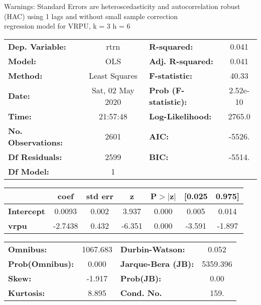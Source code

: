 Warnings: \newline
 [1] Standard Errors are heteroscedasticity and autocorrelation robust (HAC) using 1 lags and without small sample correction\\ 

regression model for VRPU, k = 3 h = 6\begin{center}
\begin{tabular}{lclc}
\toprule
\textbf{Dep. Variable:}    &       rtrn       & \textbf{  R-squared:         } &     0.041   \\
\textbf{Model:}            &       OLS        & \textbf{  Adj. R-squared:    } &     0.041   \\
\textbf{Method:}           &  Least Squares   & \textbf{  F-statistic:       } &     40.33   \\
\textbf{Date:}             & Sat, 02 May 2020 & \textbf{  Prob (F-statistic):} &  2.52e-10   \\
\textbf{Time:}             &     21:57:48     & \textbf{  Log-Likelihood:    } &    2765.0   \\
\textbf{No. Observations:} &        2601      & \textbf{  AIC:               } &    -5526.   \\
\textbf{Df Residuals:}     &        2599      & \textbf{  BIC:               } &    -5514.   \\
\textbf{Df Model:}         &           1      & \textbf{                     } &             \\
\bottomrule
\end{tabular}
\begin{tabular}{lcccccc}
                   & \textbf{coef} & \textbf{std err} & \textbf{z} & \textbf{P$> |$z$|$} & \textbf{[0.025} & \textbf{0.975]}  \\
\midrule
\textbf{Intercept} &       0.0093  &        0.002     &     3.937  &         0.000        &        0.005    &        0.014     \\
\textbf{vrpu}      &      -2.7438  &        0.432     &    -6.351  &         0.000        &       -3.591    &       -1.897     \\
\bottomrule
\end{tabular}
\begin{tabular}{lclc}
\textbf{Omnibus:}       & 1067.683 & \textbf{  Durbin-Watson:     } &    0.052  \\
\textbf{Prob(Omnibus):} &   0.000  & \textbf{  Jarque-Bera (JB):  } & 5359.396  \\
\textbf{Skew:}          &  -1.917  & \textbf{  Prob(JB):          } &     0.00  \\
\textbf{Kurtosis:}      &   8.895  & \textbf{  Cond. No.          } &     159.  \\
\bottomrule
\end{tabular}
\end{center}

